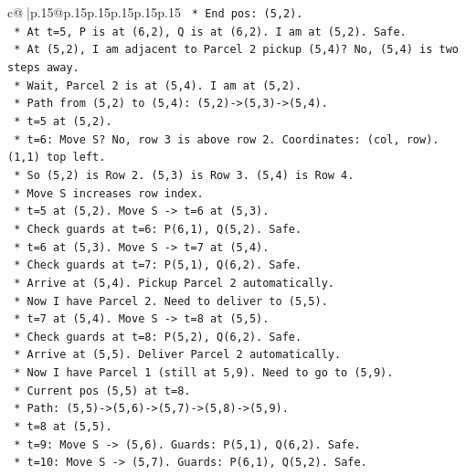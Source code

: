 \documentclass{article}
\begin{document}
{\begin{supertabular}{c@{$\;$}|p{.15\linewidth}@{}p{.15\linewidth}p{.15\linewidth}p{.15\linewidth}p{.15\linewidth}p{.15\linewidth}}
{{{\texttt{            *   End pos: (5,2).} \\
\texttt{            *   At t=5, P is at (6,2), Q is at (6,2). I am at (5,2). Safe.} \\
\texttt{            *   At (5,2), I am adjacent to Parcel 2 pickup (5,4)? No, (5,4) is two steps away.} \\
\texttt{            *   Wait, Parcel 2 is at (5,4). I am at (5,2).} \\
\texttt{            *   Path from (5,2) to (5,4): (5,2){-}>(5,3){-}>(5,4).} \\
\texttt{            *   t=5 at (5,2).} \\
\texttt{            *   t=6: Move S? No, row 3 is above row 2. Coordinates: (col, row). (1,1) top left.} \\
\texttt{            *   So (5,2) is Row 2. (5,3) is Row 3. (5,4) is Row 4.} \\
\texttt{            *   Move S increases row index.} \\
\texttt{            *   t=5 at (5,2). Move S {-}> t=6 at (5,3).} \\
\texttt{                *   Check guards at t=6: P(6,1), Q(5,2). Safe.} \\
\texttt{            *   t=6 at (5,3). Move S {-}> t=7 at (5,4).} \\
\texttt{                *   Check guards at t=7: P(5,1), Q(6,2). Safe.} \\
\texttt{                *   Arrive at (5,4). Pickup Parcel 2 automatically.} \\
\texttt{            *   Now I have Parcel 2. Need to deliver to (5,5).} \\
\texttt{            *   t=7 at (5,4). Move S {-}> t=8 at (5,5).} \\
\texttt{                *   Check guards at t=8: P(5,2), Q(6,2). Safe.} \\
\texttt{                *   Arrive at (5,5). Deliver Parcel 2 automatically.} \\
\texttt{            *   Now I have Parcel 1 (still at 5,9). Need to go to (5,9).} \\
\texttt{            *   Current pos (5,5) at t=8.} \\
\texttt{            *   Path: (5,5){-}>(5,6){-}>(5,7){-}>(5,8){-}>(5,9).} \\
\texttt{            *   t=8 at (5,5).} \\
\texttt{            *   t=9: Move S {-}> (5,6). Guards: P(5,1), Q(6,2). Safe.} \\
\texttt{            *   t=10: Move S {-}> (5,7). Guards: P(6,1), Q(5,2). Safe.} \\
}}}
\end{supertabular}}
\end{document}
